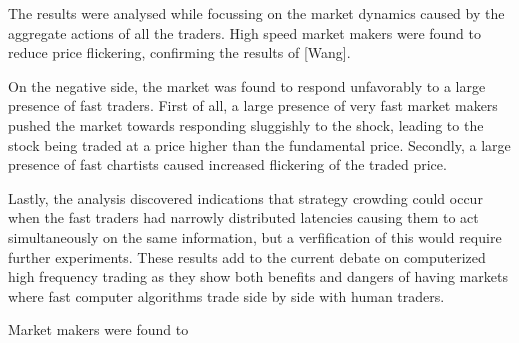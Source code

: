 The results were analysed while focussing on the market dynamics caused by the aggregate actions of all the traders. High speed market makers were found to reduce price flickering, confirming the results of [Wang]. 



On the negative side, the market was found to respond unfavorably to a large presence of fast traders.  First of all, a large presence of very fast market makers pushed the market towards responding sluggishly to the shock, leading to the stock being traded at a price higher than the fundamental price. Secondly, a large presence of fast chartists caused increased flickering of the traded price. 
	
	
	 Lastly, the analysis discovered indications that strategy crowding could occur when the fast traders had narrowly distributed latencies causing them to act simultaneously on the same information, but a verfification of this would require further experiments. These results add to the current debate on computerized high frequency trading as they show both benefits and dangers of having markets where fast computer algorithms trade side by side with human traders.



Market makers were found to 




